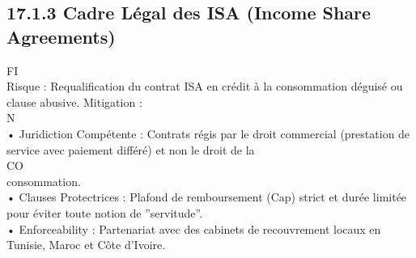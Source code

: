\subsection{17.1.3 Cadre Légal des ISA (Income Share Agreements)}
\vspace{0.5em}
\vspace{0.5em}
\vspace{0.5em}
\vspace{0.5em}
FI\\
Risque : Requalification du contrat ISA en crédit à la consommation déguisé ou clause abusive. Mitigation :\\
\vspace{0.5em}
N\\
• Juridiction Compétente : Contrats régis par le droit commercial (prestation de service avec paiement différé) et non le droit de la\\
CO\\
consommation.\\
\vspace{0.5em}
• Clauses Protectrices : Plafond de remboursement (Cap) strict et durée limitée pour éviter toute notion de ”servitude”.\\
\vspace{0.5em}
• Enforceability : Partenariat avec des cabinets de recouvrement locaux en Tunisie, Maroc et Côte d’Ivoire.\\
\vspace{0.5em}
\vspace{0.5em}
